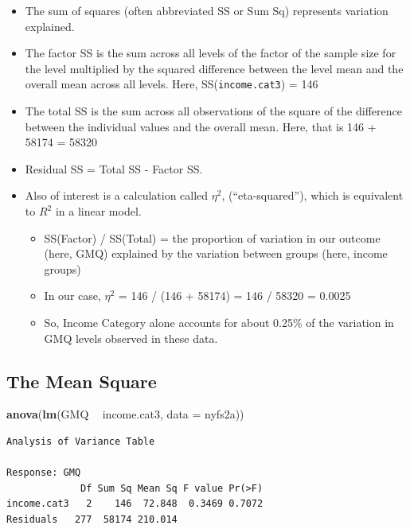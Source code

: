 \documentclass[
]{book}
\newenvironment{Shaded}{\begin{snugshade}}{\end{snugshade}}
\newcommand{\DataTypeTok}[1]{\textcolor[rgb]{0.13,0.29,0.53}{#1}}
\newcommand{\KeywordTok}[1]{\textcolor[rgb]{0.13,0.29,0.53}{\textbf{#1}}}
\newcommand{\NormalTok}[1]{#1}
\newcommand{\OperatorTok}[1]{\textcolor[rgb]{0.81,0.36,0.00}{\textbf{#1}}}
\newcommand{\StringTok}[1]{\textcolor[rgb]{0.31,0.60,0.02}{#1}}
\providecommand{\tightlist}{%
  \setlength{\itemsep}{0pt}\setlength{\parskip}{0pt}}
\begin{document}
\begin{itemize}
\tightlist
\item
  The sum of squares (often abbreviated SS or Sum Sq) represents variation explained.
\item
  The factor SS is the sum across all levels of the factor of the sample size for the level multiplied by the squared difference between the level mean and the overall mean across all levels. Here, SS(\texttt{income.cat3}) = 146
\item
  The total SS is the sum across all observations of the square of the difference between the individual values and the overall mean. Here, that is 146 + 58174 = 58320
\item
  Residual SS = Total SS - Factor SS.
\item
  Also of interest is a calculation called \(\eta^2\), (``eta-squared''), which is equivalent to \(R^2\) in a linear model.

  \begin{itemize}
  \tightlist
  \item
    SS(Factor) / SS(Total) = the proportion of variation in our outcome (here, GMQ) explained by the variation between groups (here, income groups)
  \item
    In our case, \(\eta^2\) = 146 / (146 + 58174) = 146 / 58320 = 0.0025
  \item
    So, Income Category alone accounts for about 0.25\% of the variation in GMQ levels observed in these data.
  \end{itemize}
\end{itemize}

\hypertarget{the-mean-square}{%
\subsection{The Mean Square}\label{the-mean-square}}

\begin{Shaded}
\begin{Highlighting}[]
\KeywordTok{anova}\NormalTok{(}\KeywordTok{lm}\NormalTok{(GMQ }\OperatorTok{~}\StringTok{ }\NormalTok{income.cat3, }\DataTypeTok{data =}\NormalTok{ nyfs2a))}
\end{Highlighting}
\end{Shaded}

\begin{verbatim}
Analysis of Variance Table

Response: GMQ
             Df Sum Sq Mean Sq F value Pr(>F)
income.cat3   2    146  72.848  0.3469 0.7072
Residuals   277  58174 210.014               
\end{verbatim}
\end{document}
